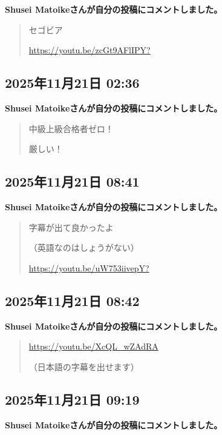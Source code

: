 \textbf{Shusei Matoikeさんが自分の投稿にコメントしました。}

\begin{quote}
セゴビア

\url{https://youtu.be/zcGt9AFlIPY?}
\end{quote}

\subsection*{2025年11月21日 02:36}

\textbf{Shusei Matoikeさんが自分の投稿にコメントしました。}

\begin{quote}
中級上級合格者ゼロ！

厳しい！
\end{quote}

\subsection*{2025年11月21日 08:41}

\textbf{Shusei Matoikeさんが自分の投稿にコメントしました。}

\begin{quote}
字幕が出て良かったよ

（英語なのはしょうがない）

\url{https://youtu.be/uW753iivepY?}
\end{quote}

\subsection*{2025年11月21日 08:42}

\textbf{Shusei Matoikeさんが自分の投稿にコメントしました。}

\begin{quote}
\url{https://youtu.be/XcQL_wZAdRA}

（日本語の字幕を出せます）
\end{quote}

\subsection*{2025年11月21日 09:19}

\textbf{Shusei Matoikeさんが自分の投稿にコメントしました。}

